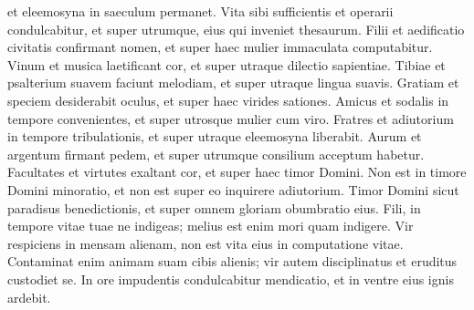\begin{biblechapter}
\begin{biblechapter}
\begin{biblechapter}
\begin{biblechapter}
\begin{biblechapter}
\begin{biblechapter}
\begin{biblechapter}
\begin{biblechapter}
\begin{biblechapter}
\begin{biblechapter}
\begin{biblechapter}
\begin{biblechapter}
\begin{biblechapter}
\begin{biblechapter}
\begin{biblechapter}
\begin{biblechapter}
\begin{biblechapter}
\begin{biblechapter}
\begin{biblechapter}
\begin{biblechapter}
\begin{biblechapter}
\begin{biblechapter}
\begin{biblechapter}
\begin{biblechapter}
\begin{biblechapter}
\begin{biblechapter}
\begin{biblechapter}
\begin{biblechapter}
\begin{biblechapter}
\begin{biblechapter}
\begin{biblechapter}
\begin{biblechapter}
\begin{biblechapter}
\begin{biblechapter}
\begin{biblechapter}
\begin{biblechapter}
\begin{biblechapter}
\begin{biblechapter}
\begin{biblechapter}
\begin{biblechapter}
 et eleemosyna in saeculum permanet.
 \verse Vita sibi sufficientis et operarii condulcabitur,
 et super utrumque, eius qui inveniet thesaurum.
 \verse Filii et aedificatio civitatis confirmant nomen,
 et super haec mulier immaculata computabitur.
 \verse Vinum et musica laetificant cor,
 et super utraque dilectio sapientiae.
 \verse Tibiae et psalterium suavem faciunt melodiam,
 et super utraque lingua suavis.
 \verse Gratiam et speciem desiderabit oculus,
 et super haec virides sationes.
 \verse Amicus et sodalis in tempore convenientes,
 et super utrosque mulier cum viro.
 \verse Fratres et adiutorium in tempore tribulationis,
 et super utraque eleemosyna liberabit.
 \verse Aurum et argentum firmant pedem,
 et super utrumque consilium acceptum habetur.
 \verse Facultates et virtutes exaltant cor,
 et super haec timor Domini.
 \verse Non est in timore Domini minoratio,
 et non est super eo inquirere adiutorium.
 \verse Timor Domini sicut paradisus benedictionis,
 et super omnem gloriam obumbratio eius.
 \verse Fili, in tempore vitae tuae ne indigeas;
 melius est enim mori quam indigere.
 \verse Vir respiciens in mensam alienam,
 non est vita eius in computatione vitae.
 Contaminat enim animam suam cibis alienis;
 \verse vir autem disciplinatus et eruditus custodiet se.
 \verse In ore impudentis condulcabitur mendicatio,
 et in ventre eius ignis ardebit.
 

\end{biblechapter}
\end{biblechapter}
\end{biblechapter}
\end{biblechapter}
\end{biblechapter}
\end{biblechapter}
\end{biblechapter}
\end{biblechapter}
\end{biblechapter}
\end{biblechapter}
\end{biblechapter}
\end{biblechapter}
\end{biblechapter}
\end{biblechapter}
\end{biblechapter}
\end{biblechapter}
\end{biblechapter}
\end{biblechapter}
\end{biblechapter}
\end{biblechapter}
\end{biblechapter}
\end{biblechapter}
\end{biblechapter}
\end{biblechapter}
\end{biblechapter}
\end{biblechapter}
\end{biblechapter}
\end{biblechapter}
\end{biblechapter}
\end{biblechapter}
\end{biblechapter}
\end{biblechapter}
\end{biblechapter}
\end{biblechapter}
\end{biblechapter}
\end{biblechapter}
\end{biblechapter}
\end{biblechapter}
\end{biblechapter}
\end{biblechapter}
